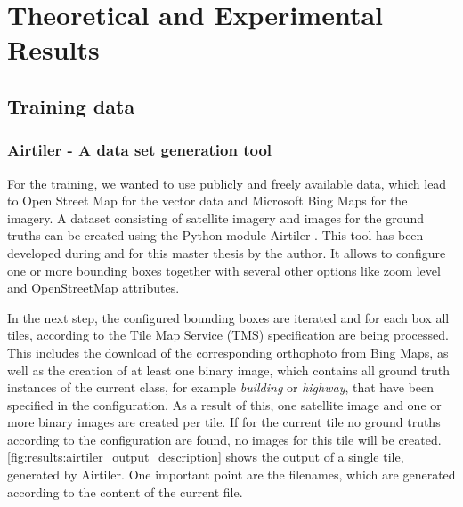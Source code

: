 
\chapter{Theoretical and Experimental Results}
\section{Training data}
\subsection{Airtiler - A data set generation tool}
For the training, we wanted to use publicly and freely available data, which lead to Open Street Map for the vector data and Microsoft Bing Maps for the imagery. A dataset consisting of satellite imagery and images for the ground truths can be created using the Python module Airtiler \cite{airtiler}. This tool has been developed during and for this master thesis by the author. It allows to configure one or more bounding boxes together with several other options like zoom level and OpenStreetMap attributes. 

In the next step, the configured bounding boxes are iterated and for each box all tiles, according to the Tile Map Service (TMS) specification \cite{tmsspec} are being processed. This includes the download of the corresponding orthophoto from Bing Maps, as well as the creation of at least one binary image, which contains all ground truth instances of the current class, for example \textit{building} or \textit{highway}, that have been specified in the configuration. As a result of this, one satellite image and one or more binary images are created per tile. If for the current tile no ground truths according to the configuration are found, no images for this tile will be created. \autoref{fig:results:airtiler_output_description} shows the output of a single tile, generated by Airtiler. One important point are the filenames, which are generated according to the content of the current file.

